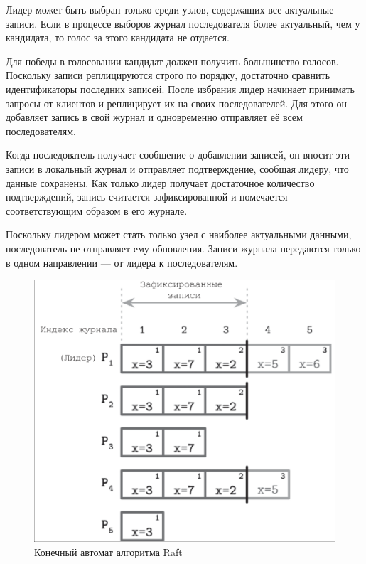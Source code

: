 Лидер может быть выбран только среди узлов, содержащих все актуальные записи.
Если в процессе выборов журнал последователя более актуальный, чем у кандидата,
то голос за этого кандидата не отдается.

Для победы в голосовании кандидат должен получить большинство голосов. Поскольку
записи реплицируются строго по порядку, достаточно сравнить идентификаторы последних
записей. После избрания лидер начинает принимать запросы от клиентов и реплицирует
их на своих последователей. Для этого он добавляет запись в свой журнал и
одновременно отправляет её всем последователям.

Когда последователь получает сообщение о добавлении записей, он вносит эти
записи в локальный журнал и отправляет подтверждение, сообщая лидеру, что данные
сохранены. Как только лидер получает достаточное количество подтверждений, запись
считается зафиксированной и помечается соответствующим образом в его журнале.

Поскольку лидером может стать только узел с наиболее актуальными данными,
последователь не отправляет ему обновления. Записи журнала передаются
только в одном направлении — от лидера к последователям.

\begin{figure}
  \centering
  \includegraphics[scale=0.4]{inc/raft-consensus.png}
  \caption{Конечный автомат алгоритма Raft}
  \label{fig:raft-consensus}
\end{figure}

